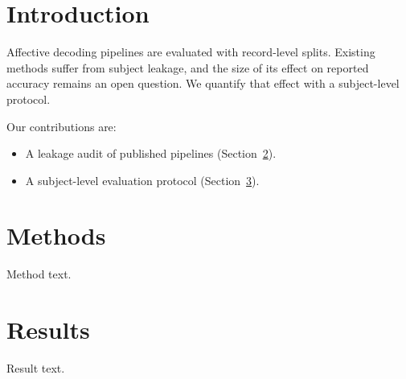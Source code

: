 \documentclass{article}
\begin{document}
\section{Introduction}
Affective decoding pipelines are evaluated with record-level splits.
Existing methods suffer from subject leakage, and the size of its effect
on reported accuracy remains an open question. We quantify that effect
with a subject-level protocol.

Our contributions are:
\begin{itemize}
\item A leakage audit of published pipelines (Section~\ref{sec:methods}).
\item A subject-level evaluation protocol (Section~\ref{sec:results}).
\end{itemize}

\section{Methods}\label{sec:methods}
Method text.

\section{Results}\label{sec:results}
Result text.
\end{document}
